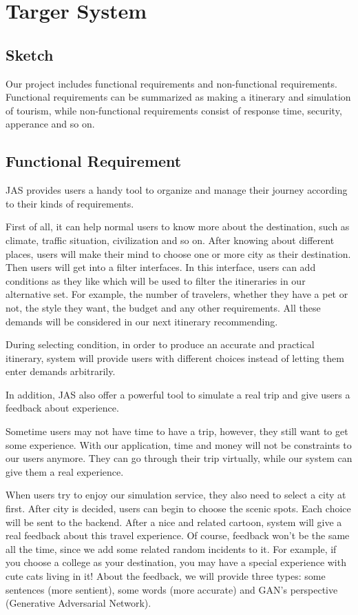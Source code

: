 \documentclass[10pt]{article}
\begin{document}
\section{Targer System}
\subsection{Sketch}
Our project includes functional requirements and non-functional requirements. Functional requirements can be summarized as making a itinerary and simulation of tourism, while non-functional requirements consist of response time, security, apperance and so on.

\subsection{Functional Requirement}
JAS provides users a handy tool to organize and manage their journey according to their kinds of requirements. 

First of all, it can help normal users to know more about the destination, such as climate, traffic situation, civilization and so on. After knowing about different places, users will make their mind to choose one or more city as their destination. Then users will get into a filter interfaces. In this interface, users can add conditions as they like which will be used to filter the itineraries in our alternative set. For example, the number of travelers, whether they have a pet or not, the style they want, the budget and any other requirements. All these demands will be considered in our next itinerary recommending.

During selecting condition, in order to produce an accurate and practical itinerary, system will provide users with different choices instead of letting them enter demands arbitrarily.

In addition, JAS also offer a powerful tool to simulate a real trip and give users a feedback about experience.

Sometime users may not have time to have a trip, however, they still want to get some experience. With our application, time and money will not be constraints to our users anymore.
They can go through their trip virtually, while our system can give them a real experience.

When users try to enjoy our simulation service, they also need to select a city at first. After city is decided, users can begin to choose the scenic spots. Each choice will be sent to the backend. After a nice and related cartoon, system will give a real feedback about this travel experience. Of course, feedback won’t be the same all the time, since we add some related random incidents to it. For example, if you choose a college as your destination, you may have a special experience with cute cats living in it! About the feedback, we will provide three types: some sentences (more sentient), some words (more accurate) and GAN’s perspective (Generative Adversarial Network). 
\end{document}

